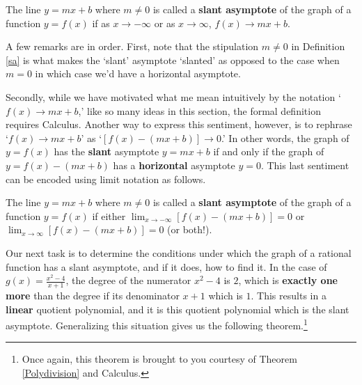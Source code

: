 \documentclass{ximera}
\begin{document}

\begin{definition} \label{sa} The line $y = mx+b$ where $m \neq 0$  is called a \textbf{slant asymptote} of the graph of a function $y=f(x)$ if as $x \rightarrow -\infty$ or as $x \rightarrow \infty$, $f(x)  \rightarrow mx+b$.


\end{definition}




A few remarks are in order.  First, note that the stipulation $m \neq 0$ in Definition \ref{sa} is what makes the `slant' asymptote `slanted' as opposed to the case when $m=0$ in which case we'd have a horizontal asymptote.  

Secondly, while we have motivated what me mean intuitively by the notation `$f(x)  \rightarrow mx+b$,' like so many ideas in this section, the formal definition requires Calculus.  Another way to express this sentiment, however, is to rephrase `$f(x)  \rightarrow mx+b$' as `$[f(x) - (mx+b)] \rightarrow 0$.'  In other words, the graph of $y=f(x)$ has the \textbf{slant} asymptote $y = mx+b$ if and only if the graph of $y = f(x) - (mx+b)$ has a \textbf{horizontal} asymptote $y=0$.   This last sentiment can be encoded using limit notation as follows.



\begin{definition} \label{sareprise} The line $y = mx+b$ where $m \neq 0$  is called a \textbf{slant asymptote} of the graph of a function $y=f(x)$ if either $\lim_{x \rightarrow -\infty} [f(x) - (mx+b)] = 0$ or $\lim_{x \rightarrow \infty} [f(x) - (mx+b)] = 0$ (or both!).

\end{definition}




Our next task is to determine the conditions under which the graph of a rational function has a slant asymptote, and if it does, how to find it.  In the case of $g(x) = \frac{x^2-4}{x+1}$, the degree of the numerator $x^2-4$ is $2$, which is \textbf{exactly one more} than the degree if its denominator $x+1$ which is $1$.  This results in a \textbf{linear} quotient polynomial, and it is this quotient polynomial which is the slant asymptote.  Generalizing this situation gives us the following theorem.\footnote{Once again, this theorem is brought to you courtesy of Theorem \ref{Polydivision} and Calculus.}
\end{document}
